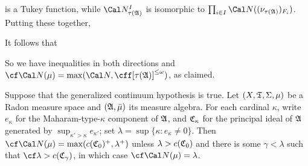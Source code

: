 {\noindent  is a Tukey function, while $\Cal N_{\tau(\frak A)}^I$ is
isomorphic to
$\prod_{i\in I}\Cal N((\nu_{\tau(\frak A)})_{F_i})$.   Putting these
together,


It follows that


\noindent So we have inequalities in both directions and
$\cf\Cal N(\mu)=\max(\Cal N,\cff[\tau(\frak A)]^{\le\omega})$, as
claimed.
}%

 Suppose that the generalized continuum
hypothesis is true.    Let $(X,\frak T,\Sigma,\mu)$ be a Radon
measure space and $(\frak A,\bar\mu)$ its measure algebra.   For each
cardinal $\kappa$, write $e_{\kappa}$ for the Maharam-type-$\kappa$
component of $\frak A$, and $\frak C_{\kappa}$ for the principal ideal
of $\frak A$ generated by $\sup_{\kappa'>\kappa}e_{\kappa'}$;  set
$\lambda=\sup\{\kappa:e_{\kappa}\ne 0\}$.   Then
$\cf\Cal N(\mu)=\max(c(\frak C_0)^+,\lambda^+)$ unless
$\lambda>c(\frak C_0)$ and there is some $\gamma<\lambda$ such that
$\cf\lambda>c(\frak C_{\gamma})$, in which case
$\cf\Cal N(\mu)=\lambda$.

